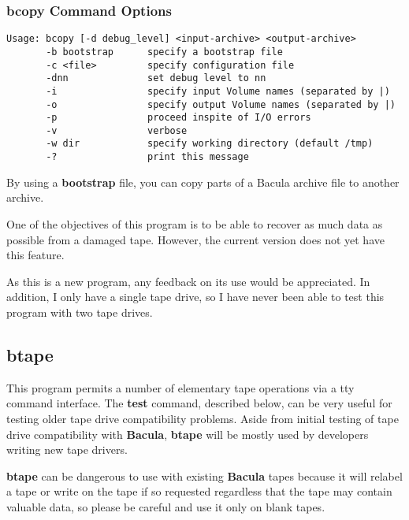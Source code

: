 \subsubsection*{bcopy Command Options}

\footnotesize
\begin{verbatim}
Usage: bcopy [-d debug_level] <input-archive> <output-archive>
       -b bootstrap      specify a bootstrap file
       -c <file>         specify configuration file
       -dnn              set debug level to nn
       -i                specify input Volume names (separated by |)
       -o                specify output Volume names (separated by |)
       -p                proceed inspite of I/O errors
       -v                verbose
       -w dir            specify working directory (default /tmp)
       -?                print this message
\end{verbatim}
\normalsize

By using a {\bf bootstrap} file, you can copy parts of a Bacula archive file
to another archive. 

One of the objectives of this program is to be able to recover as much data as
possible from a damaged tape. However, the current version does not yet have
this feature. 

As this is a new program, any feedback on its use would be appreciated. In
addition, I only have a single tape drive, so I have never been able to test
this program with two tape drives. 

\subsection*{btape}
\label{btape}

This program permits a number of elementary tape operations via a tty command
interface. The {\bf test} command, described below, can be very useful for
testing older tape drive compatibility problems. Aside from initial testing of
tape drive compatibility with {\bf Bacula}, {\bf btape} will be mostly used by
developers writing new tape drivers. 

{\bf btape} can be dangerous to use with existing {\bf Bacula} tapes because
it will relabel a tape or write on the tape if so requested regardless that
the tape may contain valuable data, so please be careful and use it only on
blank tapes. 

